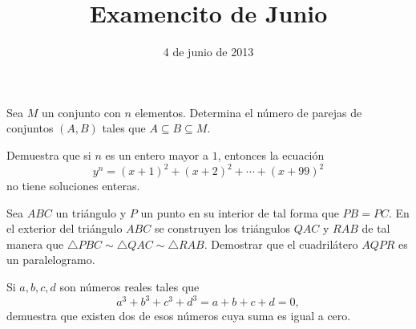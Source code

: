 \documentclass[fondo=green,onecolumn,12pt,final]{ommdoc}
\title{Examencito de Junio}
\date{4 de junio de 2013}
\begin{document}
\maketitle
\thispagestyle{empty}
\nonzeroparskip
\vspace{1cm}

\problema Sea $M$ un conjunto con $n$ elementos. Determina el número de parejas de conjuntos $(A,B)$ tales que $A\subseteq B\subseteq M$.

\problema Demuestra que si $n$ es un entero mayor a $1$, entonces la ecuación
\[
y^n = (x+1)^2 + (x+2)^2 + \cdots  + (x+99)^2 
\]
no tiene soluciones enteras.

\problema Sea $ABC$ un triángulo y $P$ un punto en su interior de tal forma que $PB=PC$. En el exterior del triángulo $ABC$ se construyen los triángulos $QAC$ y $RAB$ de tal manera que $\triangle PBC\sim \triangle QAC\sim \triangle RAB$. Demostrar que el cuadrilátero $AQPR$ es un paralelogramo.


\problema Si $a,b,c,d$ son números reales tales que
\[
a^3+b^3+c^3+d^3 = a+b+c+d = 0,
\]
demuestra que existen dos de esos números cuya suma es igual a cero.
\end{document}
